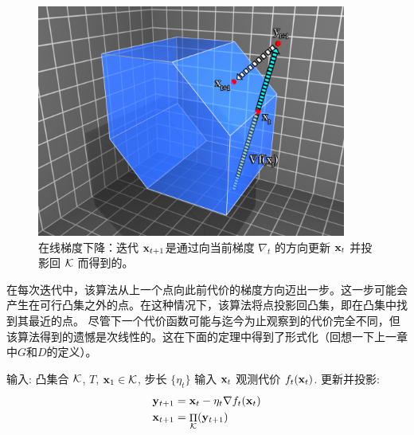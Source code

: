 \begin{figure}[h!] 
	\begin{center}
		\includegraphics[width=4in]{figs/fig_gd_poly3}
	\end{center}
	\caption{
		在线梯度下降：迭代 $\mathbf x_{t+1}$是通过向当前梯度 $\nabla_t$ 的方向更新 $\mathbf x_t$ 并投影回 $\mathcal K$ 而得到的。
		\label{fig:ogd}
		}
\end{figure}

在每次迭代中，该算法从上一个点向此前代价的梯度方向迈出一步。这一步可能会产生在可行凸集之外的点。在这种情况下，该算法将点投影回凸集，即在凸集中找到其最近的点。
尽管下一个代价函数可能与迄今为止观察到的代价完全不同，但该算法得到的遗憾是次线性的。这在下面的定理中得到了形式化（回想一下上一章中$G$和$D$的定义）。




\begin{algorithm}[h!]
		\caption{\label{figure:ogd} \ogd }
		\begin{algorithmic}[1]
			\STATE %
			输入: 凸集合 $\mathcal K$, $T$, $\mathbf x_1 \in \mathcal{K}$, 步长 $\{ \eta_t \}$
			\STATE 输入 $\mathbf x_t$ 观测代价 $f_t(\mathbf x_t)$.
			\STATE 更新并投影:
			\begin{align*}
			& \mathbf y_{t+1} = \mathbf{x}_{t}-\eta_{t} \nabla f_{t}(\mathbf{x}_{t}) \\
			& \mathbf{x}_{t+1} = \mathop{\Pi}_{\mathcal K}(\mathbf y_{t+1})
			\end{align*}
			\ENDFOR
		\end{algorithmic}
\end{algorithm}
	




